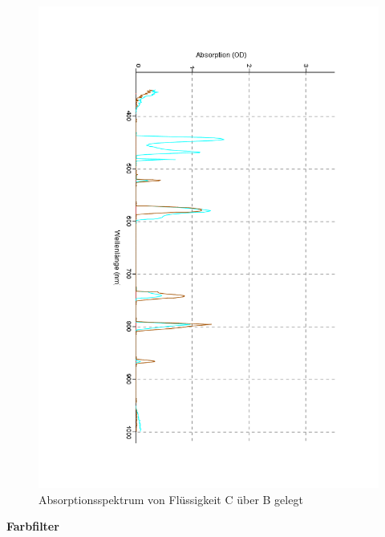 \documentclass[12pt,a4paper]{article}
\begin{document}
\begin{figure}[H]
	\centering
	\includegraphics[scale=0.5,angle = 90,trim = 20mm 20mm 20mm 20mm]{./data/Spektro/Absorbtion_CuB_DO_4.pdf}
	\caption{Absorptionsspektrum von Flüssigkeit C über B gelegt}
	\label{fig:AbsorbtionCuB}
\end{figure}

\textbf{Farbfilter}
\end{document}

